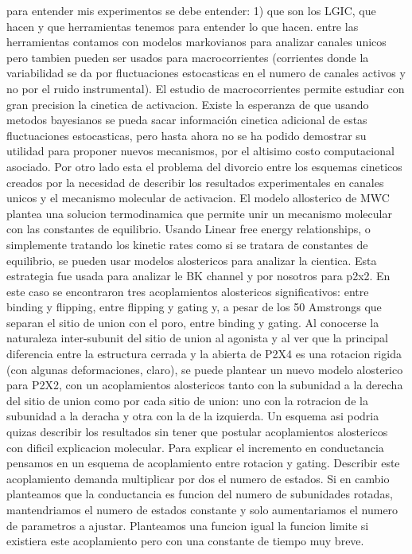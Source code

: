 \documentclass[pdflatex,sn-mathphys-num]{sn-jnl}%
\theoremstyle{thmstyleone}%
\theoremstyle{thmstyletwo}%
\theoremstyle{thmstylethree}%
\begin{document}
para entender mis experimentos se debe entender: 
1) que son los LGIC, que hacen y que herramientas tenemos para entender lo que hacen.
entre las herramientas contamos con modelos markovianos para analizar canales unicos pero tambien pueden ser usados para macrocorrientes (corrientes donde 
la variabilidad se da por fluctuaciones estocasticas en el numero de canales activos y no por el ruido instrumental).
El estudio de macrocorrientes permite estudiar con gran precision la cinetica de activacion. Existe la esperanza de que usando metodos bayesianos se pueda sacar información cinetica adicional de estas fluctuaciones estocasticas, pero hasta ahora no se ha podido demostrar su utilidad para proponer nuevos mecanismos, por el altisimo costo computacional asociado.   
Por otro lado esta el problema del divorcio entre los esquemas cineticos creados por la necesidad de describir los resultados experimentales en canales unicos y el mecanismo molecular de activacion. El modelo allosterico de MWC plantea una solucion termodinamica que permite unir un mecanismo molecular con las constantes de equilibrio. Usando Linear free energy relationships, o simplemente tratando los kinetic rates como si se tratara de constantes de equilibrio, se pueden usar modelos alostericos para analizar la cientica. Esta estrategia fue usada para analizar le BK channel \cite{Horrigan2002CouplingBV} y por nosotros para p2x2. En este caso se encontraron tres acoplamientos alostericos significativos: entre binding y flipping, entre flipping y gating y, a pesar de los 50 Amstrongs que separan el sitio de union con el poro,  entre binding y gating. 
Al conocerse la naturaleza inter-subunit del sitio de union al agonista y al ver que la principal diferencia entre la  estructura cerrada y la abierta de P2X4 es una rotacion rigida (con algunas deformaciones, claro), se puede plantear un nuevo modelo alosterico para P2X2, con un acoplamientos alostericos tanto con la subunidad a la derecha del sitio de union como  por cada sitio de union: uno con la rotracion de la subunidad a la deracha y otra con la de la izquierda. Un esquema asi podria quizas describir los resultados sin tener que postular acoplamientos alostericos con dificil explicacion molecular. Para explicar el incremento en conductancia pensamos en un esquema de acoplamiento entre rotacion y gating. Describir este acoplamiento demanda multiplicar por dos el numero de estados. Si en cambio planteamos que la conductancia es funcion del numero de subunidades rotadas, mantendriamos el numero de estados constante y solo aumentariamos el numero de parametros a ajustar. Planteamos una funcion igual la funcion limite si existiera este acoplamiento pero con una constante de tiempo muy breve. 
\end{document}

